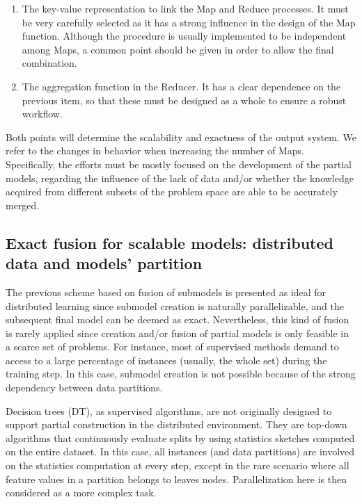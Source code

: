 \documentclass[3p,review]{elsarticle}
\begin{document}
\begin{enumerate}
\item The key-value representation to link the Map and Reduce processes. It must be very carefully selected as it has a strong influence in the design of the Map function. Although the procedure is usually implemented to be independent among Maps, a common point should be given in order to allow the final combination. 

\item The aggregation function in the Reducer. It has a clear dependence on the previous item, so that these must be designed as a whole to ensure a robust workflow.

\end{enumerate}

Both points will determine the scalability and exactness of the output system. We refer to the changes in behavior when increasing the number of Maps. Specifically, the efforts must be mostly focused on the development of the partial models, regarding the influence of the lack of data and/or whether the knowledge acquired from different subsets of the problem space are able to be accurately merged.

\subsection{Exact fusion for scalable models: distributed data and models' partition}\label{subsec:exact}

The previous scheme based on fusion of submodels is presented as ideal for distributed learning since submodel creation is naturally parallelizable, and the subsequent final model can be deemed as exact. Nevertheless, this kind of fusion is rarely applied since creation and/or fusion of partial models is only feasible in a scarce set of problems. For instance, most of supervised methods demand to access to a large percentage of instances (usually, the whole set) during the training step. In this case, submodel creation is not possible because of the strong dependency between data partitions. 

Decision trees (DT), as supervised algorithms, are not originally designed to support partial construction in the distributed environment. They are top-down algorithms that continuously evaluate splits by using statistics sketches computed on the entire dataset. In this case, all instances (and data partitions) are involved on the statistics computation at every step, except in the rare scenario where all feature values in a partition belongs to leaves nodes. Parallelization here is then considered as a more complex task.
\end{document}
